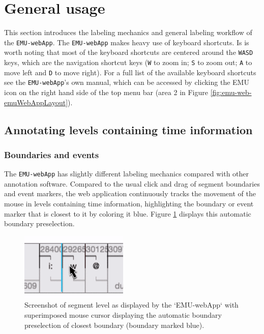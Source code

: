 \documentclass[]{book}
\begin{document}
\hypertarget{sec:webApp-generalUsage}{%
\section{General usage}\label{sec:webApp-generalUsage}}

This section introduces the labeling mechanics and general labeling workflow of the \texttt{EMU-webApp}. The \texttt{EMU-webApp} makes heavy use of keyboard shortcuts. Is is worth noting that most of the keyboard shortcuts are centered around the \texttt{WASD} keys, which are the navigation shortcut keys (\texttt{W} to zoom in; \texttt{S} to zoom out; \texttt{A} to move left and \texttt{D} to move right). For a full list of the available keyboard shortcuts see the \texttt{EMU-webApp}'s own manual, which can be accessed by clicking the EMU icon on the right hand side of the top menu bar (area 2 in Figure \ref{fig:emu-web-emuWebAppLayout}).

\hypertarget{annotating-levels-containing-time-information}{%
\subsection{Annotating levels containing time information}\label{annotating-levels-containing-time-information}}

\hypertarget{boundaries-and-events}{%
\subsubsection{Boundaries and events}\label{boundaries-and-events}}

The \texttt{EMU-webApp} has slightly different labeling mechanics compared with other annotation software. Compared to the usual click and drag of segment boundaries and event markers, the web application continuously tracks the movement of the mouse in levels containing time information, highlighting the boundary or event marker that is closest to it by coloring it blue. Figure \ref{fig:webApp-preSelBoundary} displays this automatic boundary preselection.

\begin{figure}

{\centering \includegraphics[width=0.4\linewidth]{pics/preSelBoundary} 

}

\caption{Screenshot of segment level as displayed by the `EMU-webApp` with superimposed mouse cursor displaying the automatic boundary preselection of closest boundary (boundary marked blue).}\label{fig:webApp-preSelBoundary}
\end{figure}
\end{document}
